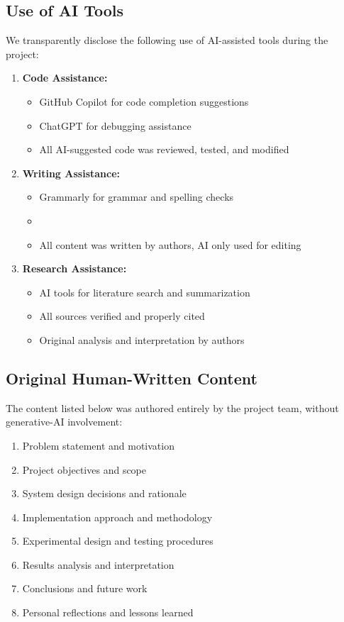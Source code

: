 \subsection{Use of AI Tools}

We transparently disclose the following use of AI-assisted tools during the project:

\begin{enumerate}
    \item \textbf{Code Assistance:}
    \begin{itemize}
        \item GitHub Copilot for code completion suggestions
        \item ChatGPT for debugging assistance
        \item All AI-suggested code was reviewed, tested, and modified
    \end{itemize}
    
    \item \textbf{Writing Assistance:}
    \begin{itemize}
        \item Grammarly for grammar and spelling checks
        \item [Other tools, if applicable]
        \item All content was written by authors, AI only used for editing
    \end{itemize}
    
    \item \textbf{Research Assistance:}
    \begin{itemize}
        \item AI tools for literature search and summarization
        \item All sources verified and properly cited
        \item Original analysis and interpretation by authors
    \end{itemize}
\end{enumerate}

\subsection{Original Human-Written Content}

The content listed below was authored entirely by the project team, without generative-AI involvement:

\begin{enumerate}
    \item Problem statement and motivation
    \item Project objectives and scope
    \item System design decisions and rationale
    \item Implementation approach and methodology
    \item Experimental design and testing procedures
    \item Results analysis and interpretation
    \item Conclusions and future work
    \item Personal reflections and lessons learned
\end{enumerate}

